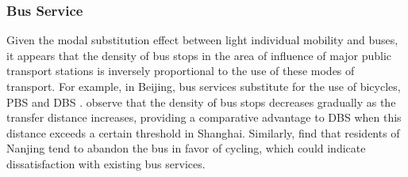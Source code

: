 \begin{refsegment}
\subsubsection*{Bus Service
    \label{chap2:desserte-bus}
    }

Given the modal substitution effect between light individual mobility and buses, it appears that the density of bus stops in the area of influence of major public transport stations is inversely proportional to the use of these modes of transport. For example, in Beijing, bus services substitute for the use of bicycles, \acrshort{PBS} \textcolor{blue}{\autocite[55]{zhao_bicycle-metro_2017}} and \acrshort{DBS} \textcolor{blue}{\autocite[16]{wang_spatiotemporal_2020}}. \textcolor{blue}{\textcite[10]{li_exploring_2021}} observe that the density of bus stops decreases gradually as the transfer distance increases, providing a comparative advantage to \acrshort{DBS} when this distance exceeds a certain threshold in Shanghai. Similarly, \textcolor{blue}{\textcite[20]{luan_better_2020}} find that residents of Nanjing tend to abandon the bus in favor of cycling, which could indicate dissatisfaction with existing bus services.%


\end{refsegment}
